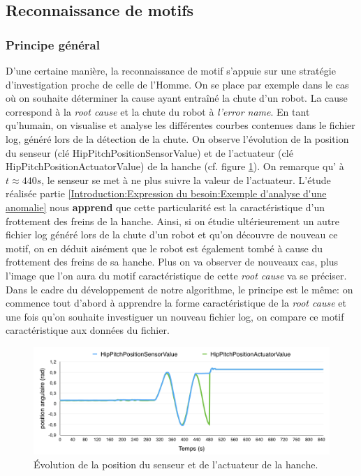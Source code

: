 \subsection{Reconnaissance de motifs}
\label{Automatisation du processus d'investigation: Reconnaissance de motifs}

\subsubsection{Principe général}
\label{Automatisation du processus d'investigation: Reconnaissance de motifs: Principes généraux}
D'une certaine manière, la reconnaissance de motif s'appuie sur une stratégie d'investigation proche de celle de l'Homme. On se place par exemple dans le cas où on souhaite déterminer la cause ayant entraîné la chute d'un robot. La cause correspond à la \emph{root cause} et la chute du robot à \emph{l'error name}. En tant qu'humain, on visualise et analyse les différentes courbes contenues dans le fichier log, généré lors de la détection de la chute. On observe l'évolution de la position du senseur (clé HipPitchPositionSensorValue) et de l'actuateur (clé HipPitchPositionActuatorValue) de la hanche (cf. figure \ref{fig:Évolution de la position du senseur et de l'actuateur de la hanche}). On remarque qu' à $t \approx 440 s$, le senseur se met à ne plus suivre la valeur de l'actuateur. L'étude réalisée partie \ref{Introduction:Expression du besoin:Exemple d'analyse d'une anomalie} nous \textbf{apprend} que cette particularité est la caractéristique d'un frottement des freins de la hanche. Ainsi, si on étudie ultérieurement un autre fichier log généré lors de la chute d'un robot et qu'on découvre de nouveau ce motif, on en déduit aisément que le robot est également tombé à cause du frottement des freins de sa hanche. Plus on va observer de nouveaux cas, plus l'image que l'on aura du motif caractéristique de cette \emph{root cause} va se préciser.\\
Dans le cadre du développement de notre algorithme, le principe est le même: on commence tout d'abord à apprendre la forme caractéristique de la\emph{ root cause} et une fois qu'on souhaite investiguer un nouveau fichier log, on compare ce motif caractéristique aux données du fichier. 

\begin{figure}[h]
	\centering\includegraphics[width=12cm]{images/HipPitch.png}
	\caption[Évolution de la position du senseur et de l'actuateur de la hanche]{Évolution de la position du senseur et de l'actuateur de la hanche.}
	\label{fig:Évolution de la position du senseur et de l'actuateur de la hanche}
\end{figure}

